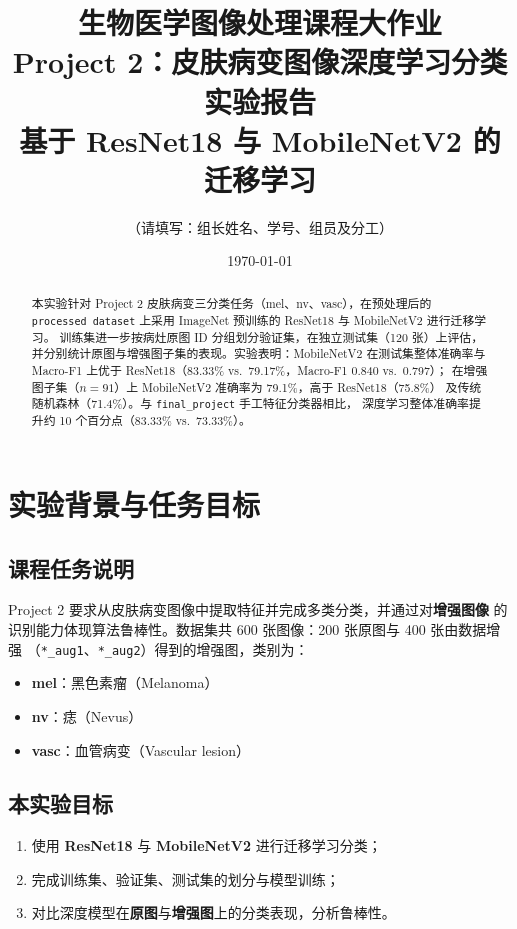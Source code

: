 \documentclass[12pt,a4paper]{ctexart}
\title{\textbf{生物医学图像处理课程大作业}\\
\large Project 2：皮肤病变图像深度学习分类实验报告\\
\large 基于 ResNet18 与 MobileNetV2 的迁移学习}
\author{（请填写：组长姓名、学号、组员及分工）}
\date{\today}
\begin{document}
\maketitle

\begin{abstract}
本实验针对 Project 2 皮肤病变三分类任务（mel、nv、vasc），在预处理后的
\texttt{processed dataset} 上采用 ImageNet 预训练的 ResNet18 与 MobileNetV2 进行迁移学习。
训练集进一步按病灶原图 ID 分组划分验证集，在独立测试集（120 张）上评估，
并分别统计原图与增强图子集的表现。实验表明：MobileNetV2 在测试集整体准确率与
Macro-F1 上优于 ResNet18（83.33\% vs.\ 79.17\%，Macro-F1 0.840 vs.\ 0.797）；
在增强图子集（$n{=}91$）上 MobileNetV2 准确率为 79.1\%，高于 ResNet18（75.8\%）
及传统随机森林（71.4\%）。与 \texttt{final\_project} 手工特征分类器相比，
深度学习整体准确率提升约 10 个百分点（83.33\% vs.\ 73.33\%）。
\end{abstract}

\tableofcontents
\newpage

\section{实验背景与任务目标}

\subsection{课程任务说明}
Project 2 要求从皮肤病变图像中提取特征并完成多类分类，并通过对\textbf{增强图像}
的识别能力体现算法鲁棒性。数据集共 600 张图像：200 张原图与 400 张由数据增强
（\texttt{*\_aug1}、\texttt{*\_aug2}）得到的增强图，类别为：
\begin{itemize}
  \item \textbf{mel}：黑色素瘤（Melanoma）
  \item \textbf{nv}：痣（Nevus）
  \item \textbf{vasc}：血管病变（Vascular lesion）
\end{itemize}

\subsection{本实验目标}
\begin{enumerate}
  \item 使用 \textbf{ResNet18} 与 \textbf{MobileNetV2} 进行迁移学习分类；
  \item 完成训练集、验证集、测试集的划分与模型训练；
  \item 对比深度模型在\textbf{原图}与\textbf{增强图}上的分类表现，分析鲁棒性。
\end{enumerate}
\end{document}
